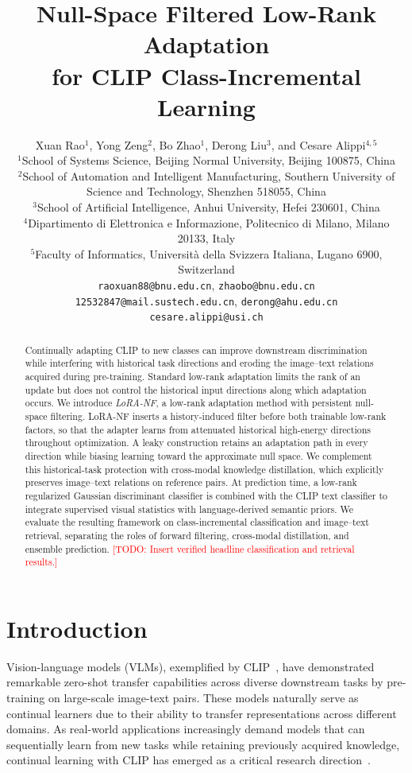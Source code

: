 \documentclass{article}
\title{Null-Space Filtered Low-Rank Adaptation\\
for CLIP Class-Incremental Learning}
\author{%
Xuan Rao$^1$, Yong Zeng$^2$, Bo Zhao$^1$, Derong Liu$^3$, and Cesare Alippi$^{4,5}$\\
$^1$School of Systems Science, Beijing Normal University, Beijing 100875, China\\
$^2$School of Automation and Intelligent Manufacturing, Southern University of Science and Technology, Shenzhen 518055, China\\
$^3$School of Artificial Intelligence, Anhui University, Hefei 230601, China\\
$^4$Dipartimento di Elettronica e Informazione, Politecnico di Milano, Milano 20133, Italy\\
$^5$Faculty of Informatics, Universit\`{a} della Svizzera Italiana, Lugano 6900, Switzerland\\
\texttt{raoxuan88@bnu.edu.cn}, \texttt{zhaobo@bnu.edu.cn}\\
\texttt{12532847@mail.sustech.edu.cn}, \texttt{derong@ahu.edu.cn}\\
\texttt{cesare.alippi@usi.ch}
}
\newcommand{\todo}[1]{\textcolor{red}{[TODO: #1]}}
\begin{document}
\maketitle

\begin{abstract}
Continually adapting CLIP to new classes can improve downstream discrimination while interfering with historical task directions and eroding the image--text relations acquired during pre-training. Standard low-rank adaptation limits the rank of an update but does not control the historical input directions along which adaptation occurs. We introduce \emph{LoRA-NF}, a low-rank adaptation method with persistent null-space filtering. LoRA-NF inserts a history-induced filter before both trainable low-rank factors, so that the adapter learns from attenuated historical high-energy directions throughout optimization. A leaky construction retains an adaptation path in every direction while biasing learning toward the approximate null space. We complement this historical-task protection with cross-modal knowledge distillation, which explicitly preserves image--text relations on reference pairs. At prediction time, a low-rank regularized Gaussian discriminant classifier is combined with the CLIP text classifier to integrate supervised visual statistics with language-derived semantic priors. We evaluate the resulting framework on class-incremental classification and image--text retrieval, separating the roles of forward filtering, cross-modal distillation, and ensemble prediction. \todo{Insert verified headline classification and retrieval results.}
\end{abstract}




\iffalse
\section{Introduction}
\label{sec:intro}
Vision-language models (VLMs), exemplified by CLIP~\cite{radford2021learning}, have demonstrated remarkable zero-shot transfer capabilities across diverse downstream tasks by pre-training on large-scale image-text pairs. These models naturally serve as continual learners due to their ability to transfer representations across different domains. As real-world applications increasingly demand models that can sequentially learn from new tasks while retaining previously acquired knowledge, continual learning with CLIP has emerged as a critical research direction~\cite{wang2024lora,zheng2023zscl}.
\end{document}
